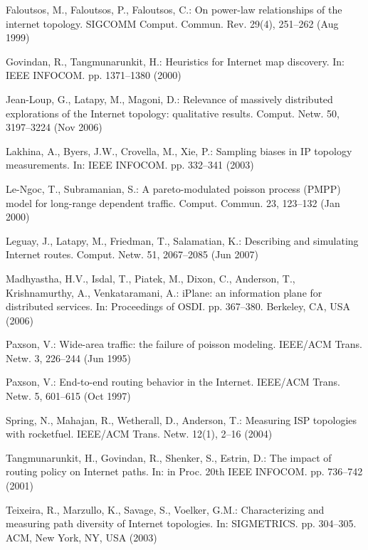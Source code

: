 \documentclass[a4paper]{llncs}
\begin{document}
\begin{thebibliography}{10}
Faloutsos, M., Faloutsos, P., Faloutsos, C.: On power-law relationships of the
  internet topology. SIGCOMM Comput. Commun. Rev.  29(4),  251--262 (Aug 1999)

Govindan, R., Tangmunarunkit, H.: Heuristics for \uppercase{I}nternet map
  discovery. In: IEEE INFOCOM. pp. 1371--1380 (2000)

Jean-Loup, G., Latapy, M., Magoni, D.: Relevance of massively distributed
  explorations of the \uppercase{I}nternet topology: qualitative results.
  Comput. Netw.  50,  3197--3224 (Nov 2006)

Lakhina, A., Byers, J.W., Crovella, M., Xie, P.: Sampling biases in
  \uppercase{IP} topology measurements. In: IEEE INFOCOM. pp. 332--341 (2003)

Le-Ngoc, T., Subramanian, S.: A pareto-modulated poisson process
  (\uppercase{PMPP}) model for long-range dependent traffic. Comput. Commun.
  23,  123--132 (Jan 2000)

Leguay, J., Latapy, M., Friedman, T., Salamatian, K.: Describing and simulating
  \uppercase{i}nternet routes. Comput. Netw.  51,  2067--2085 (Jun 2007)

Madhyastha, H.V., Isdal, T., Piatek, M., Dixon, C., Anderson, T.,
  Krishnamurthy, A., Venkataramani, A.: i\uppercase{P}lane: an information
  plane for distributed services. In: Proceedings of OSDI. pp. 367--380.
  Berkeley, CA, USA (2006)

Paxson, V.: Wide-area traffic: the failure of poisson modeling. IEEE/ACM Trans.
  Netw.  3,  226--244 (Jun 1995)

Paxson, V.: End-to-end routing behavior in the \uppercase{I}nternet. IEEE/ACM
  Trans. Netw.  5,  601--615 (Oct 1997)

Spring, N., Mahajan, R., Wetherall, D., Anderson, T.: Measuring \uppercase{ISP}
  topologies with rocketfuel. IEEE/ACM Trans. Netw.  12(1),  2--16 (2004)

Tangmunarunkit, H., Govindan, R., Shenker, S., Estrin, D.: The impact of
  routing policy on \uppercase{i}nternet paths. In: in Proc. 20th IEEE INFOCOM.
  pp. 736--742 (2001)

Teixeira, R., Marzullo, K., Savage, S., Voelker, G.M.: Characterizing and
  measuring path diversity of \uppercase{i}nternet topologies. In: SIGMETRICS.
  pp. 304--305. ACM, New York, NY, USA (2003)


\end{thebibliography}
\end{document}
